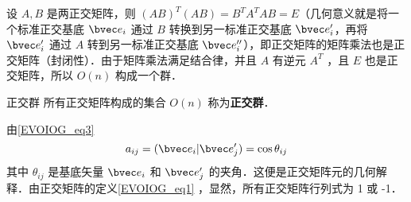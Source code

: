 设 $A,B$ 是两正交矩阵，则 $(AB)^T(AB)=B^TA^TAB=E$（几何意义就是将一个标准正交基底 $\bvec e_i$ 通过 $B$ 转换到另一标准正交基底 $\bvec e'_i$，再将 $\bvec e'_i$ 通过 $A$ 转到另一标准正交基底 $\bvec e''_i$），即正交矩阵的矩阵乘法也是正交矩阵（封闭性）．由于矩阵乘法满足结合律，并且 $A$ 有逆元 $A^T$ ，且 $E$ 也是正交矩阵，所以 $O(n)$ 构成一个群．
\begin{definition}{正交群}
所有正交矩阵构成的集合 $O(n)$ 称为\textbf{正交群}．
\end{definition}

由\autoref{EVOIOG_eq3} 
\begin{equation}
a_{ij}=(\bvec e_i|\bvec e'_j)=\cos{\theta_{ij}}
\end{equation}
其中 $\theta_{ij}$ 是基底矢量 $\bvec e_i$ 和 $\bvec e'_j$ 的夹角．这便是正交矩阵元的几何解释．由正交矩阵的定义\autoref{EVOIOG_eq1} ，显然，所有正交矩阵行列式为 1 或 -1．